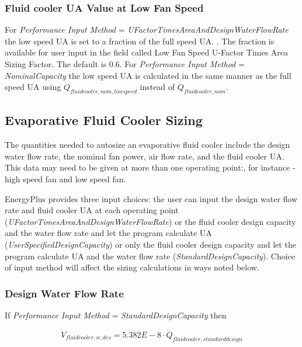 \subsubsection{Fluid cooler UA Value at Low Fan Speed}\label{fluid-cooler-ua-value-at-low-fan-speed}

For \emph{Performance Input Method} = \emph{UFactorTimesAreaAndDesignWaterFlowRate} the low speed UA is set to a fraction of the full speed UA. . The fraction is available for user input in the field called Low Fan Speed U-Factor Times Area Sizing Factor. The default is 0.6. For \emph{Performance Input Method} = \emph{NominalCapacity} the low speed UA is calculated in the same manner as the full speed UA using \({\dot Q_{fluidcooler,nom,lowspeed}}\) instead of \({\dot Q_{fluidcooler,nom}}\).

\subsection{Evaporative Fluid Cooler Sizing}\label{evaporative-fluid-cooler-sizing}

The quantities needed to autosize an evaporative fluid cooler include the design water flow rate, the nominal fan power, air flow rate, and the fluid cooler UA. This data may need to be given at more than one operating point:, for instance - high speed fan and low speed fan.

EnergyPlus provides three input choices: the user can input the design water flow rate and fluid cooler UA at each operating point (\emph{UFactorTimesAreaAndDesignWaterFlowRate}) or the fluid cooler design capacity and the water flow rate and let the program calculate UA (\emph{UserSpecifiedDesignCapacity}) or only the fluid cooler design capacity and let the program calculate UA and the water flow rate (\emph{StandardDesignCapacity}). Choice of input method will affect the sizing calculations in ways noted below.

\subsubsection{Design Water Flow Rate}\label{design-water-flow-rate-2}

If \emph{Performance Input Method} = \emph{StandardDesignCapacity} then

\begin{equation}
{\dot V_{fluidcooler,w,des}} = 5.382E - 8\cdot {\dot Q_{fluidcooler,standarddesign}}
\end{equation}

